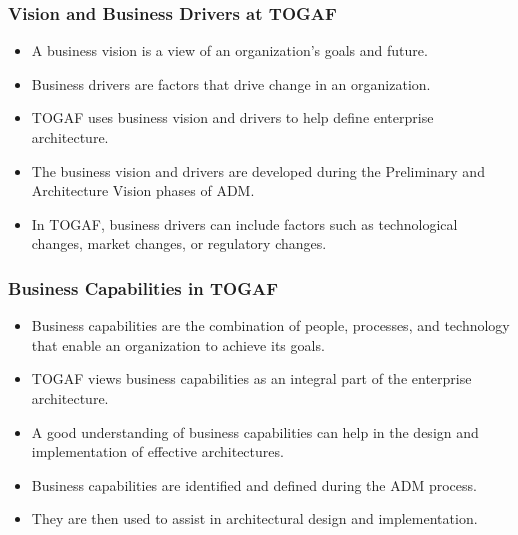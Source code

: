 \documentclass[aspectratio=169, table]{beamer}
\begin{document}
    \begin{frame}
        \frametitle{Vision and Business Drivers at TOGAF}
        \begin{itemize}
            \item A business vision is a view of an organization's goals and future.
            \item Business drivers are factors that drive change in an organization.
            \item TOGAF uses business vision and drivers to help define enterprise architecture.
            \item The business vision and drivers are developed during the Preliminary and Architecture Vision phases of ADM.
            \item In TOGAF, business drivers can include factors such as technological changes, market changes, or regulatory changes.
        \end{itemize}
    \end{frame}

    \begin{frame}
        \frametitle{Business Capabilities in TOGAF}
        \begin{itemize}
            \item Business capabilities are the combination of people, processes, and technology that enable an organization to achieve its goals.
            \item TOGAF views business capabilities as an integral part of the enterprise architecture.
            \item A good understanding of business capabilities can help in the design and implementation of effective architectures.
            \item Business capabilities are identified and defined during the ADM process.
            \item They are then used to assist in architectural design and implementation.
        \end{itemize}
    \end{frame}
\end{document}
